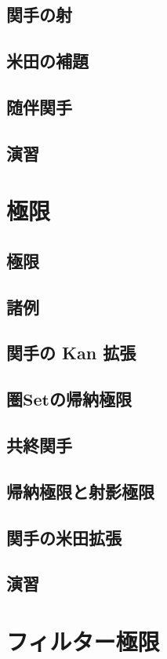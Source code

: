 \documentclass[a5paper, dvipdfmx]{jsbook}
\theoremstyle{definition}
\numberwithin{equation}{section} %
\begin{document}
\section{関手の射}

\section{米田の補題}

\section{随伴関手}
\section*{演習}

\chapter{極限}

\section{極限}
\section{諸例}
\section{関手の Kan 拡張}
\section{圏$\mathbf{Set}$の帰納極限}
\section{共終関手}
\section{帰納極限と射影極限}
\section{関手の米田拡張}
\section*{演習}

\chapter{フィルター極限}
\end{document}
